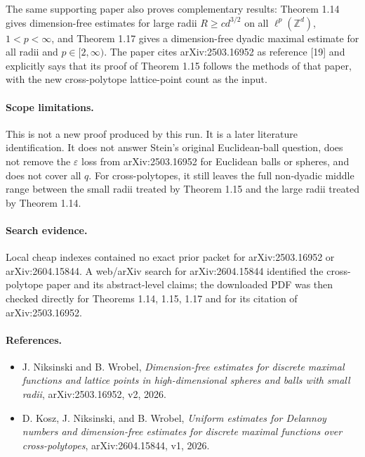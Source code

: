 \documentclass[11pt]{article}
\newcommand{\Z}{\mathbb Z}
\begin{document}
The same supporting paper also proves complementary results: Theorem 1.14 gives
dimension-free estimates for large radii \(R\ge c d^{3/2}\) on all
\(\ell^p(\Z^d)\), \(1<p<\infty\), and Theorem 1.17 gives a dimension-free
dyadic maximal estimate for all radii and \(p\in[2,\infty)\).  The paper cites
arXiv:2503.16952 as reference [19] and explicitly says that its proof of
Theorem 1.15 follows the methods of that paper, with the new cross-polytope
lattice-point count as the input.

\paragraph{Scope limitations.}
This is not a new proof produced by this run.  It is a later literature
identification.  It does not answer Stein's original Euclidean-ball question,
does not remove the \(\varepsilon\) loss from arXiv:2503.16952 for Euclidean
balls or spheres, and does not cover all \(q\).  For cross-polytopes, it still
leaves the full non-dyadic middle range between the small radii treated by
Theorem 1.15 and the large radii treated by Theorem 1.14.

\paragraph{Search evidence.}
Local cheap indexes contained no exact prior packet for arXiv:2503.16952 or
arXiv:2604.15844.  A web/arXiv search for arXiv:2604.15844 identified the
cross-polytope paper and its abstract-level claims; the downloaded PDF was then
checked directly for Theorems 1.14, 1.15, 1.17 and for its citation of
arXiv:2503.16952.

\paragraph{References.}
\begin{itemize}
\item J. Niksinski and B. Wrobel, \emph{Dimension-free estimates for discrete
maximal functions and lattice points in high-dimensional spheres and balls with
small radii}, arXiv:2503.16952, v2, 2026.
\item D. Kosz, J. Niksinski, and B. Wrobel, \emph{Uniform estimates for
Delannoy numbers and dimension-free estimates for discrete maximal functions
over cross-polytopes}, arXiv:2604.15844, v1, 2026.
\end{itemize}
\end{document}
